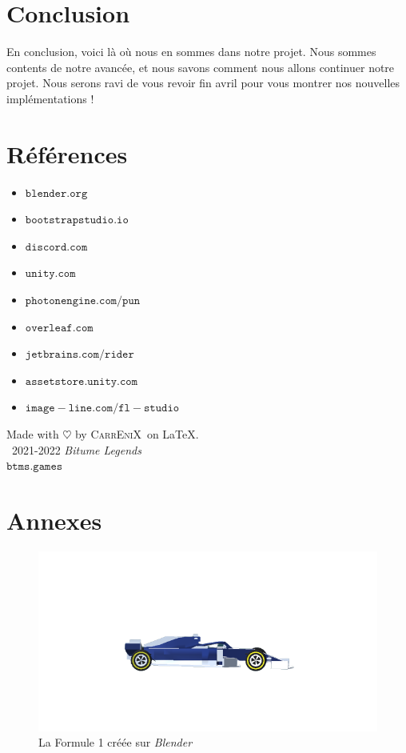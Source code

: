\documentclass[12pt,a4paper]{article}
\newcommand{\btmlgs}{\textsl{Bitume Legends}}
\newcommand{\CEX}{\textsc{CarrEniX}}
\begin{document}
\clearpage

\section*{Conclusion}
    En conclusion, voici là où nous en sommes dans notre projet.
    Nous sommes contents de notre avancée, et nous savons comment
    nous allons continuer notre projet. 
    Nous serons ravi de vous revoir fin avril pour vous montrer nos nouvelles
    implémentations !

\section*{Références}
    \begin{itemize}
        \item \(\mathtt{blender.org}\)
        \item \(\mathtt{bootstrapstudio.io}\)
        \item \(\mathtt{discord.com}\)
        \item \(\mathtt{unity.com}\)
        \item \(\mathtt{photonengine.com/pun}\)
        \item \(\mathtt{overleaf.com}\)
        \item \(\mathtt{jetbrains.com/rider}\)
        \item \(\mathtt{assetstore.unity.com}\)
        \item \(\mathtt{image-line.com/fl-studio}\)\\[6cm]
    \end{itemize}

\begin{center}
    Made with $\heartsuit$ by \CEX\, on \LaTeX.\\
    \textcopyright\, 2021-2022 \btmlgs\\
    \(\mathtt{btms.games}\)
\end{center}

\clearpage
{}
\section*{Annexes}
\listoffigures

\begin{figure}[h]
    \includegraphics[width=15cm]{f21BG.png}
    \caption{La Formule 1 créée sur \textsl{Blender}}
    \label{fig:F1}
    \centering
\end{figure}
\end{document}
